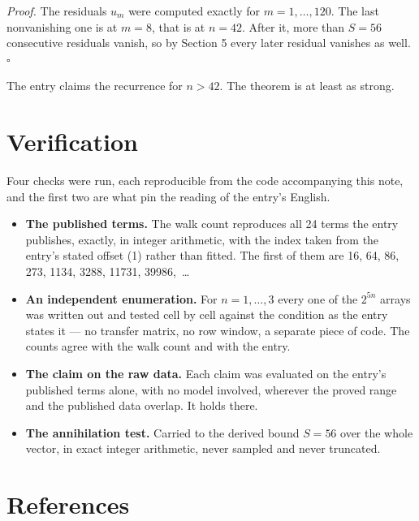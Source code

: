 \documentclass[11pt]{article}
\theoremstyle{definition}
\begin{document}
{\itshape Proof.} The residuals $u_m$ were computed exactly for $m = 1,\dots,120$. The last nonvanishing one is at $m = 8$, that is at $n = 42$. After it, more than $S = 56$ consecutive residuals vanish, so by Section 5 every later residual vanishes as well. $\square$

The entry claims the recurrence for $n > 42$. The theorem is at least as strong.

\section{Verification}

Four checks were run, each reproducible from the code accompanying this note, and the first two are what pin the reading of the entry's English.

\begin{itemize}

\item {\bfseries The published terms.} The walk count reproduces all 24 terms the entry publishes, exactly, in integer arithmetic, with the index taken from the entry's stated offset (1) rather than fitted. The first of them are 16, 64, 86, 273, 1134, 3288, 11731, 39986,~\dots

\item {\bfseries An independent enumeration.} For $n = 1,\dots,3$ every one of the $2^{5n}$ arrays was written out and tested cell by cell against the condition as the entry states it --- no transfer matrix, no row window, a separate piece of code. The counts agree with the walk count and with the entry.

\item {\bfseries The claim on the raw data.} Each claim was evaluated on the entry's published terms alone, with no model involved, wherever the proved range and the published data overlap. It holds there.

\item {\bfseries The annihilation test.} Carried to the derived bound $S = 56$ over the whole vector, in exact integer arithmetic, never sampled and never truncated.

\end{itemize}

\section{References}
\end{document}
